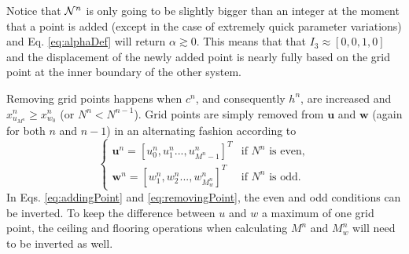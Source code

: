 Notice that $\mathcal{N}^n$ is only going to be slightly bigger than an integer at the moment that a point is added (except in the case of extremely quick parameter variations) and Eq. \eqref{eq:alphaDef} will return $\alpha \gtrsim 0$.
This means that that $I_3 \approx [0, 0, 1, 0]$ and the displacement of the newly added point is nearly fully based on the grid point at the inner boundary of the other system. %

Removing grid points happens when $c^n$, and consequently $h^n$, are increased and $x_{u_{M^n}}^n \geq x_{w_0}^n$ (or $ N^n <  N^{n-1}$). %
Grid points are simply removed from $\mathbf{u}$ and $\mathbf{w}$ (again for both $n$ and $n-1$) in an alternating fashion according to
\begin{equation}\label{eq:removingPoint}
\begin{cases}
    \mathbf{u}^n = [u_0^n, u_1^n ..., u_{M^n-1}^n]^T & \text{if $N^n$ is even}, \\
     \mathbf{w}^n = [w_1^n, w_2^n ..., w_{M_w^n}^n]^T & \text{if $N^n$ is odd}.
    \end{cases}
\end{equation}
In Eqs. \eqref{eq:addingPoint} and \eqref{eq:removingPoint}, the even and odd conditions can be inverted. To keep the difference between $u$ and $w$ a maximum of one grid point, the ceiling and flooring operations when calculating $M^n$ and $M_w^n$ will need to be inverted as well.

